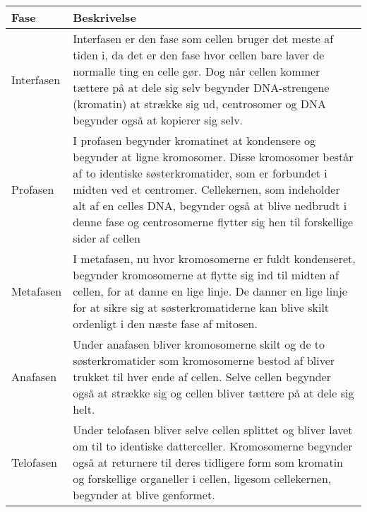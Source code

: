\begin{longtable}{| m{3cm} | m{14cm} |}
    \hline 
    Fase & Beskrivelse \\ \hline
    Interfasen & Interfasen er den fase som cellen bruger det meste af tiden i, da det er den fase hvor cellen bare laver de normalle ting en celle gør. Dog når cellen kommer tættere på at dele sig selv begynder DNA-strengene (kromatin) at strække sig ud, centrosomer og DNA begynder også at kopierer sig selv. \\ \hline

    Profasen & I profasen begynder kromatinet at kondensere og begynder at ligne kromosomer. Disse kromosomer består af to identiske søsterkromatider, som er forbundet i midten ved et centromer. Cellekernen, som indeholder alt af en celles DNA, begynder også at blive nedbrudt i denne fase og centrosomerne flytter sig hen til forskellige sider af cellen \\ \hline

    Metafasen & I metafasen, nu hvor kromosomerne er fuldt kondenseret, begynder kromosomerne at flytte sig ind til midten af cellen, for at danne en lige linje. De danner en lige linje for at sikre sig at søsterkromatiderne kan blive skilt ordenligt i den næste fase af mitosen. \\ \hline

    Anafasen & Under anafasen bliver kromosomerne skilt og de to søsterkromatider som kromosomerne bestod af bliver trukket til hver ende af cellen. Selve cellen begynder også at strække sig og cellen bliver tættere på at dele sig helt. \\ \hline

    Telofasen & Under telofasen bliver selve cellen splittet og bliver lavet om til to identiske datterceller. Kromosomerne begynder også at returnere til deres tidligere form som kromatin og forskellige organeller i cellen, ligesom cellekernen, begynder at blive genformet. \\ \hline
    
\end{longtable}

